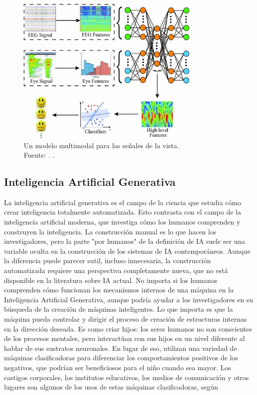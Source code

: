 \begin{figure}[!ht]
	\begin{center}
		\includegraphics[width=0.79\textwidth]{2/figures/multimodal_deep_learning_example.jpg}
		\caption[Un modelo multimodal para las señales de la vista]{Un modelo multimodal para las señales de la vista.\\
		Fuente: \cite{tec_baheti2020introduction_mdl}. .}
		\label{2:fig7}
	\end{center}
\end{figure}

\subsection{Inteligencia Artificial Generativa}

La inteligencia artificial generativa es el campo de la ciencia que estudia cómo crear inteligencia totalmente automatizada. Esto contrasta con el campo de la inteligencia artificial moderna, que investiga cómo los humanos comprenden y construyen la inteligencia. La construcción manual es lo que hacen los investigadores, pero la parte "por humanos" de la definición de IA suele ser una variable oculta en la construcción de los sistemas de IA contemporáneos. Aunque la diferencia puede parecer sutil, incluso innecesaria, la construcción automatizada requiere una perspectiva completamente nueva, que no está disponible en la literatura sobre IA actual. No importa si los humanos comprenden cómo funcionan los mecanismos internos de una máquina en la Inteligencia Artificial Generativa, aunque podría ayudar a los investigadores en su búsqueda de la creación de máquinas inteligentes. Lo que importa es que la máquina pueda controlar y dirigir el proceso de creación de estructuras internas en la dirección deseada. Es como criar hijos: los seres humanos no son conscientes de los procesos mentales, pero interactúan con sus hijos en un nivel diferente al hablar de sus sustratos neuronales. En lugar de eso, utilizan una variedad de máquinas clasificadoras para diferenciar los comportamientos positivos de los negativos, que podrían ser beneficiosos para el niño cuando sea mayor. Los castigos corporales, los institutos educativos, los medios de comunicación y otros lugares son algunos de los usos de estas máquinas clasificadoras, según \parencite{th_zant2010genai}

